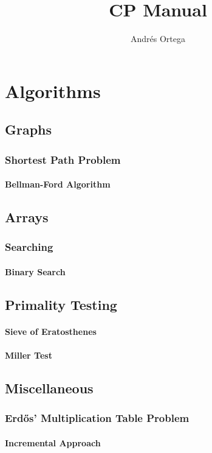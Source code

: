 \documentclass[12pt]{book}
\newcommand{\<}{\langle}
\renewcommand{\>}{\rangle}
\renewcommand{\(}{\left(}
\renewcommand{\)}{\right)}
\begin{document}
\title{CP Manual}
\author{Andrés Ortega}
\date{}

\maketitle

\tableofcontents

\chapter{Algorithms}
    \section{Graphs}
        \subsection{Shortest Path Problem}
            \subsubsection{Bellman-Ford Algorithm}
                
    \section{Arrays}
        \subsection{Searching}
            \subsubsection{Binary Search}
                

    \section{Primality Testing}
        \subsubsection{Sieve of Eratosthenes}
            

        \subsubsection{Miller Test}
            

    \section{Miscellaneous}
        \subsection{Erdős' Multiplication Table Problem}
            \subsubsection{Incremental Approach}
                

\printbibliography
\end{document}
